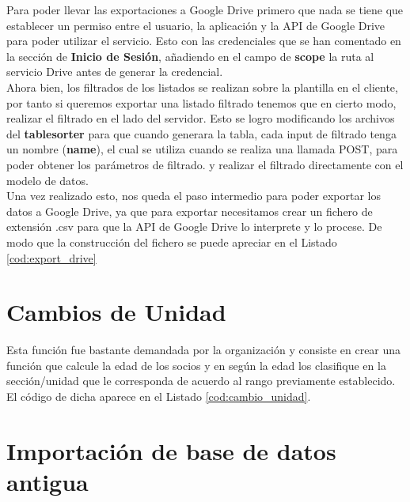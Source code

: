 Para poder llevar las exportaciones a Google Drive primero que nada se tiene que establecer un permiso entre el  usuario, la aplicación y la API de Google Drive para poder utilizar el servicio. Esto con las credenciales que se han
comentado en la sección de \textbf{Inicio de Sesión}, añadiendo en el campo de \textbf{scope} la ruta al servicio Drive antes de generar la credencial.\\

Ahora bien, los filtrados de los listados se realizan sobre la plantilla en el cliente, por tanto si queremos exportar una listado filtrado tenemos que en cierto modo, realizar el filtrado en el lado del servidor.
Esto se logro modificando los archivos del \textbf{tablesorter} para que cuando generara la tabla, cada input de filtrado tenga un nombre (\textbf{name}), el cual se utiliza cuando se realiza una llamada POST, para poder obtener los parámetros de filtrado.
y realizar el filtrado directamente con el modelo de datos.\\

Una vez realizado esto, nos queda el paso intermedio para poder exportar los datos a Google Drive, ya que para exportar necesitamos crear un fichero de extensión .csv para que la API de Google Drive lo interprete y lo procese.
De modo que la construcción del fichero se puede apreciar en el Listado \ref{cod:export_drive}\\



\section{Cambios de Unidad}
\label{4:sec10}

Esta función fue bastante demandada por la organización y consiste en crear una función que calcule la edad de los socios y en según la edad los clasifique en la sección/unidad que le corresponda de acuerdo al rango previamente
establecido.\\

El código de dicha aparece en el Listado \ref{cod:cambio_unidad}.\\



\section{Importación de base de datos antigua}
\label{4:sec11}

